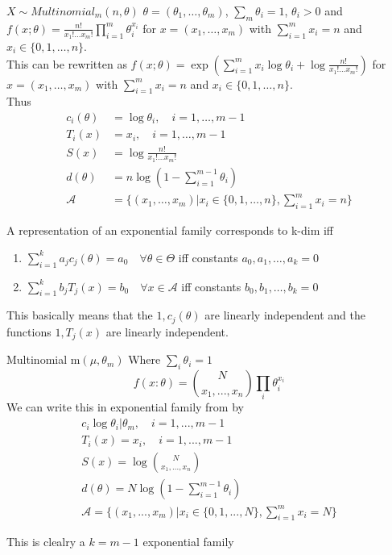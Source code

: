 \documentclass[answers,12pt,addpoints]{exam}
\begin{document}
\begin{example}
    $X \sim Multinomial_m(n, \theta)$ $\theta = (\theta_1, \ldots, \theta_m)$, $\sum_m \theta_i = 1$, $\theta_i > 0$ and $f(x;\theta) = \frac{n!}{x_1! \ldots x_m!} \prod_{i=1}^{m} \theta_i^{x_i}$ for $x = (x_1, \ldots, x_m)$ with $\sum_{i=1}^{m} x_i = n$ and $x_i \in \{0,1,\ldots,n\}$.\\
    This can be rewritten as $f(x;\theta) = \exp\left( \sum_{i=1}^{m} x_i \log \theta_i + \log \frac{n!}{x_1! \ldots x_m!} \right)$ for $x = (x_1, \ldots, x_m)$ with $\sum_{i=1}^{m} x_i = n$ and $x_i \in \{0,1,\ldots,n\}$.\\
    Thus 
    \begin{align*}
        c_i(\theta) &= \log \theta_i, \quad i = 1, \ldots, m-1\\
        T_i(x) &= x_i, \quad i = 1, \ldots, m-1\\
        S(x) &= \log \frac{n!}{x_1! \ldots x_m!}\\
        d(\theta) &= n\log(1-\sum_{i=1}^{m-1} \theta_i)\\
        \mathcal{A} &= \{(x_1, \ldots, x_m) | x_i \in \{0,1,\ldots,n\}, \sum_{i=1}^{m} x_i = n\}
    \end{align*}
\end{example}
\begin{lemma}
    A representation of an exponential family corresponds to k-dim iff 
    \begin{enumerate}
        \item $\sum_{i=1}^k a_j c_j(\theta) = a_0 \quad \forall \theta \in \Theta$ iff constants $a_0, a_1, \ldots, a_k = 0$
        \item $\sum_{i=1}^k b_j T_j(x) = b_0 \quad \forall x \in \mathcal{A}$ iff constants $b_0, b_1, \ldots, b_k = 0$
    \end{enumerate}
    This basically means that the $1,c_j(\theta)$ are linearly independent and the functions $1, T_j(x)$ are linearly independent.
\end{lemma}
\begin{example}
    Multinomial m$(\mu, \theta_m)$ Where $\sum_i \theta_i =1$
    $$f(x: \theta) = \binom{N}{x_1, ..., x_n} \prod_i \theta_i^{x_i}$$
    We can write this in exponential family from by 
    \begin{align*}
        c_i \log \theta_i | \theta_m , \quad i = 1, ..., m-1\\
        T_i(x) = x_i, \quad i = 1, ..., m-1\\
        S(x) = \log \binom{N}{x_1, ..., x_n}\\
        d(\theta) = N \log(1 - \sum_{i=1}^{m-1} \theta_i)\\
        \mathcal{A} = \{(x_1, ..., x_m) | x_i \in \{0, 1, ..., N\}, \sum_{i=1}^{m} x_i = N\}
    \end{align*}

    This is clealry a $k= m-1$ exponential family 
\end{example}
\end{document}
